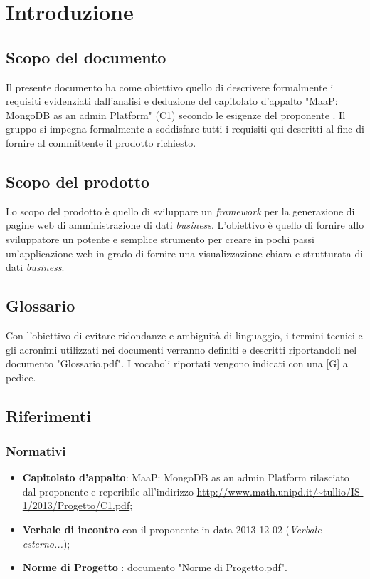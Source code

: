 \section{Introduzione}


\subsection{Scopo del documento}
Il presente documento ha come obiettivo quello di descrivere formalmente i requisiti evidenziati dall'analisi e deduzione del capitolato d'appalto "MaaP: MongoDB as an admin Platform" (C1) secondo le esigenze del proponente \Proponente{}. Il gruppo \GroupName{} si impegna formalmente a soddisfare tutti i requisiti qui descritti al fine di fornire al committente il prodotto richiesto.

\subsection{Scopo del prodotto}
Lo scopo del prodotto è quello di sviluppare un \textit{framework} per la generazione di pagine web di amministrazione di dati \textit{business}. L'obiettivo è quello di fornire allo sviluppatore un potente e semplice strumento per creare in pochi passi un'applicazione web in grado di fornire una visualizzazione chiara e strutturata di dati \textit{business}.

\subsection{Glossario}
Con l'obiettivo di evitare ridondanze e ambiguità di linguaggio, i termini tecnici e gli acronimi utilizzati nei documenti verranno definiti e descritti riportandoli nel documento "Glossario.pdf". I vocaboli riportati vengono indicati con una [G] a pedice.

\subsection{Riferimenti}
	\subsubsection{Normativi}
	\begin{itemize}
	\item \textbf{Capitolato d'appalto}: MaaP: MongoDB as an admin Platform rilasciato dal proponente
	\Proponente{} e reperibile all'indirizzo 
	\url{http://www.math.unipd.it/~tullio/IS-1/2013/Progetto/C1.pdf};
	\item \textbf{Verbale di incontro} con il proponente \Proponente{} in data 2013-12-02 (\textit{Verbale esterno...});
	\item \textbf{Norme di Progetto} : documento "Norme di Progetto.pdf". 
	\end{itemize}
	
